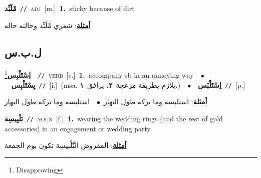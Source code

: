 \documentclass[10pt,a4paper,twoside]{article} %
\begin{document}
\begin{multicols}{2}
{{{{{{{{\setlength\topsep{0pt}\textbf{\foreignlanguage{arabic}{مْلَبِّد}}\ {\color{gray}\texttt{//}\color{black}}\ \textsc{adj}\ [m.]\ \textbf{1.}~sticky because of dirt\  \begin{flushright}\color{gray}\foreignlanguage{arabic}{\textbf{\underline{\foreignlanguage{arabic}{أمثلة}}}: شعري مْلَبِّد وحالته حاله}\end{flushright}\color{black}} \vspace{2mm}

\vspace{-3mm}
\subsection*{\color{blue}\foreignlanguage{arabic}{ل.ب.س}\color{blue}{}} 

{\setlength\topsep{0pt}\textbf{\foreignlanguage{arabic}{اِسْتَلْبِس}}\footnote{Disapproving}\ \ {\color{gray}\texttt{//}\color{black}}\ \textsc{verb}\ [c.]\ \textbf{1.}~accompany sb in an annoying way\ \ $\bullet$\ \ \setlength\topsep{0pt}\textbf{\foreignlanguage{arabic}{يِسْتَلْبِس}}\ {\color{gray}\texttt{//}\color{black}}\ [i.]\ \color{gray}(msa. \foreignlanguage{arabic}{يلازم بطريقة مزعجة}~\foreignlanguage{arabic}{\textbf{٢.}}  \foreignlanguage{arabic}{يرافق}~\foreignlanguage{arabic}{\textbf{١.}})\color{black}\ \ $\bullet$\ \ \setlength\topsep{0pt}\textbf{\foreignlanguage{arabic}{اِسْتَلْبَس}}\ {\color{gray}\texttt{//}\color{black}}\ [p.]\  \begin{flushright}\color{gray}\foreignlanguage{arabic}{\textbf{\underline{\foreignlanguage{arabic}{أمثلة}}}: استلبسه وما تركه طول النهار\ $\bullet$\ \  استلبسه وما تركه طول النهار}\end{flushright}\color{black}} \vspace{2mm}

{\setlength\topsep{0pt}\textbf{\foreignlanguage{arabic}{تَلْبِيسِة}}\ {\color{gray}\texttt{//}\color{black}}\ \textsc{noun}\ [f.]\ \textbf{1.}~wearing the wedding rings (and the rest of gold accessories) in an engagement or wedding party\  \begin{flushright}\color{gray}\foreignlanguage{arabic}{\textbf{\underline{\foreignlanguage{arabic}{أمثلة}}}: المفروض التَّلْبيسِة تكون يوم الجمعة}\end{flushright}\color{black}} \vspace{2mm}

}}}}}}}
\end{multicols}
\end{document}
